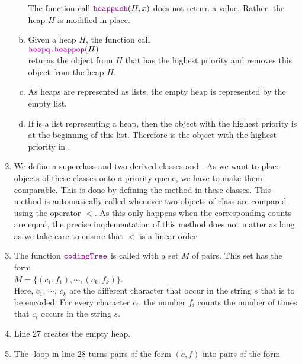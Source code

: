 \begin{enumerate}
\begin{enumerate}[(a)]
            The function call $\mytt{heappush}(H, x)$ does not return a value.  Rather, the heap $H$ is
            modified in place.
      \item Given a heap $H$, the function call
            \\[0.2cm]
            \hspace*{1.3cm}
            $\mytt{heapq.heappop}(H)$
            \\[0.2cm]
            returns the object from $H$ that has the highest priority and removes this object from the heap
            $H$.
      \item As heaps are represented as lists, the empty heap is represented by the empty list.
      \item If  is a list representing a heap, then the object with the highest priority is at the
            beginning of this list.  Therefore  is the object with the highest priority in .
      \end{enumerate}
\item We define a superclass  and two derived classes  and .
      As we want to place objects of these classes onto a priority queue, we have to make them comparable.
      This is done by defining the method  in these classes.  This method is automatically 
      called whenever two objects of class  are compared using the operator $<$.
      As this only happens when the corresponding counts are equal, the precise implementation of this
      method does not matter as long as we take care to ensure that $<$ is a linear order.
\item The function $\mytt{codingTree}$ is called with a set  $M$ of pairs.  This set has the form
      \\[0.2cm]
      \hspace*{1.3cm}
      $M = \bigl\{ (c_1, f_1), \cdots, (c_k, f_k) \bigr\}$.
      \\[0.2cm]
      Here, $c_1$, $\cdots$, $c_k$ are the different character that occur in the string $s$ that is to be encoded. 
      For every character $c_i$, the number $f_i$ counts the number of times that $c_i$ occurs in the string
      $s$.
\item Line 27 creates the empty heap.
\item The -loop in line 28 turns pairs of the form $(c, f)$ into pairs of the form
      \\[0.2cm]
      \hspace*{1.3cm}

\end{enumerate}

